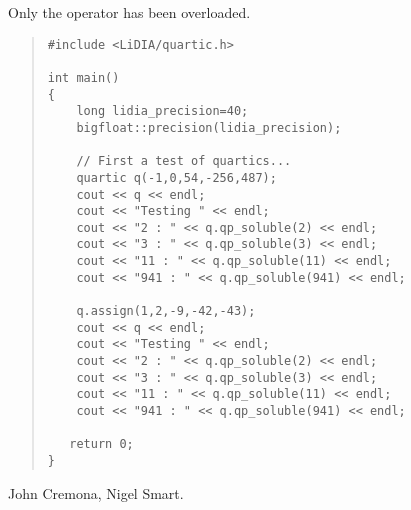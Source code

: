 
\IO

Only the  operator \code{<<} has been overloaded.



\EXAMPLES

\begin{quote}
\begin{verbatim}
#include <LiDIA/quartic.h>

int main()
{
    long lidia_precision=40;
    bigfloat::precision(lidia_precision);

    // First a test of quartics...
    quartic q(-1,0,54,-256,487);
    cout << q << endl;
    cout << "Testing " << endl;
    cout << "2 : " << q.qp_soluble(2) << endl;
    cout << "3 : " << q.qp_soluble(3) << endl;
    cout << "11 : " << q.qp_soluble(11) << endl;
    cout << "941 : " << q.qp_soluble(941) << endl;

    q.assign(1,2,-9,-42,-43);
    cout << q << endl;
    cout << "Testing " << endl;
    cout << "2 : " << q.qp_soluble(2) << endl;
    cout << "3 : " << q.qp_soluble(3) << endl;
    cout << "11 : " << q.qp_soluble(11) << endl;
    cout << "941 : " << q.qp_soluble(941) << endl;

   return 0;
}
\end{verbatim}
\end{quote}



\AUTHOR

John Cremona, Nigel Smart.
